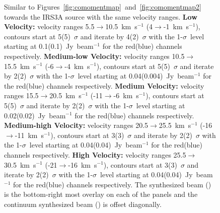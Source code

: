 \begin{figure}[H]
\begin{center}
   \caption{Similar to Figures~\ref{fig:comomentmap}~and~\ref{fig:comomentmap2} towards the IRS3A source with the same velocity ranges. \textbf{Low Velocity:} velocity ranges 5.5$\rightarrow$10.5~km~s$^{-1}$ (4$\rightarrow$-1~km~s$^{-1}$), contours start at 5(5)~$\sigma$ and iterate by 4(2)~$\sigma$ with the 1-$\sigma$~level starting at 0.1(0.1)~Jy~beam$^{-1}$ for the red(blue) channels respectively. \textbf{Medium-low Velocity:} velocity ranges 10.5$\rightarrow$15.5~km~s$^{-1}$ (-6$\rightarrow$-4~km~s$^{-1}$), contours start at 5(5)~$\sigma$ and iterate by 2(2)~$\sigma$ with the 1-$\sigma$~level starting at 0.04(0.004)~Jy~beam$^{-1}$ for the red(blue) channels respectively. \textbf{Medium Velocity:} velocity ranges 15.5$\rightarrow$20.5~km~s$^{-1}$ (-11$\rightarrow$-6~km~s$^{-1}$), contours start at 5(5)~$\sigma$ and iterate by 2(2)~$\sigma$ with the 1-$\sigma$~level starting at 0.02(0.02)~Jy~beam$^{-1}$ for the red(blue) channels respectively. \textbf{Medium-high Velocity:} velocity ranges 20.5$\rightarrow$25.5~km~s$^{-1}$ (-16$\rightarrow$-11~km~s$^{-1}$), contours start at 3(3)~$\sigma$ and iterate by 2(2)~$\sigma$ with the 1-$\sigma$~level starting at 0.04(0.04)~Jy~beam$^{-1}$ for the red(blue) channels respectively. \textbf{High Velocity:} velocity ranges 25.5$\rightarrow$30.5~km~s$^{-1}$ (-21$\rightarrow$-16~km~s$^{-1}$), contours start at 3(3)~$\sigma$ and iterate by 2(2)~$\sigma$ with the 1-$\sigma$~level starting at 0.04(0.04)~Jy~beam$^{-1}$ for the red(blue) channels respectively. The \co\space synthesized beam (\cobeam) is the bottom-right most overlay on each of the panels and the continuum synthesized beam (\contbeam) is offset diagonally.}\label{fig:comomentmapirs3a}
\end{center}
\end{figure}

